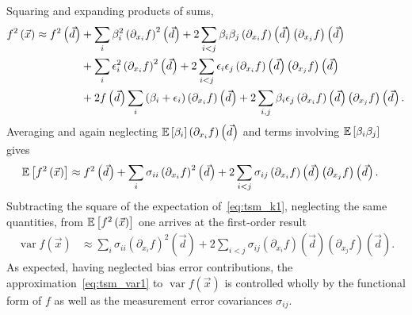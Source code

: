 Squaring and expanding products of sums,
\begin{align}
  f^2\left(\vec{x}\right) \approx f^2\left(\vec{d}\right)
 &+   \sum_i \beta_i^2
             \left(\partial_{x_i} f\right)^2\left(\vec{d}\right)
  +  2\sum_{i<j} \beta_i \beta_j
                 \left(\partial_{x_i} f\right)\left(\vec{d}\right)
                 \left(\partial_{x_j} f\right)\left(\vec{d}\right)
\notag\\
 &+   \sum_i \epsilon_i^2  \left(\partial_{x_i} f\right)^2\left(\vec{d}\right)
  +  2\sum_{i<j} \epsilon_i \epsilon_j
                 \left(\partial_{x_i} f\right)\left(\vec{d}\right)
                 \left(\partial_{x_j} f\right)\left(\vec{d}\right)
\notag\\
 &+ 2 f\left(\vec{d}\right) \sum_i
                            \left(\beta_i+\epsilon_i\right)
                            \left(\partial_{x_i} f\right)\left(\vec{d}\right)
  + 2 \sum_{i,j} \beta_i \epsilon_j
                 \left(\partial_{x_i} f\right)\left(\vec{d}\right)
                 \left(\partial_{x_j} f\right)\left(\vec{d}\right).
\end{align}
Averaging and again neglecting $\operatorname{\mathbb{E}}\left[\beta_i\right]\left(\partial_{x_i}
f\right)\left(\vec{d}\right)$ and terms involving $\operatorname{\mathbb{E}}\left[\beta_i \beta_j\right]$
gives
\begin{align}
  \operatorname{\mathbb{E}}\left[f^2\left(\vec{x}\right)\right]
&\approx
    f^2\left(\vec{d}\right)
  +  \sum_i \sigma_{ii}     \left(\partial_{x_i} f\right)^2\left(\vec{d}\right)
  + 2\sum_{i<j} \sigma_{ij} \left(\partial_{x_i} f\right)  \left(\vec{d}\right)
                            \left(\partial_{x_j} f\right)  \left(\vec{d}\right).
\end{align}
Subtracting the square of the expectation of~\eqref{eq:tsm_k1}, neglecting the
same quantities, from $\operatorname{\mathbb{E}}\left[f^2\left(\vec{x}\right)\right]$ one arrives at the
first-order result
\begin{align}
  \operatorname{var} f\left(\vec{x}\right)
&\approx
     \sum_i \sigma_{ii}     \left(\partial_{x_i} f\right)^2\left(\vec{d}\right)
  + 2\sum_{i<j} \sigma_{ij} \left(\partial_{x_i} f\right)  \left(\vec{d}\right)
                            \left(\partial_{x_j} f\right)  \left(\vec{d}\right)
\label{eq:tsm_var1}.
\end{align}
As expected, having neglected bias error contributions, the
approximation~\eqref{eq:tsm_var1} to $\operatorname{var} f\left(\vec{x}\right)$
is controlled wholly by the functional form of $f$ as well as the measurement
error covariances $\sigma_{ij}$.

